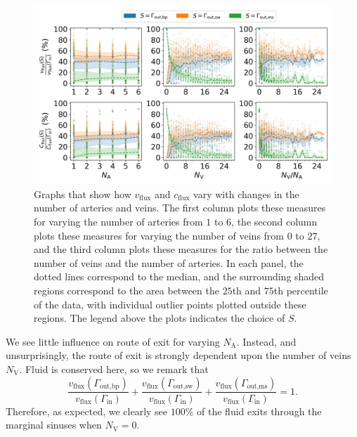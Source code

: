             \begin{figure}
                \centering
                \includegraphics[width=\textwidth]{diagrams/results-variations/mega3_no-arteries_no-veins_veins-to-arteries.png}
                \caption{Graphs that show how $v_\text{flux}$ and $c_\text{flux}$ vary with changes in the number of arteries and veins. The first column plots these measures for varying the number of arteries from $1$ to $6$, the second column plots these measures for varying the number of veins from $0$ to $27$, and the third column plots these measures for the ratio between the number of veins and the number of arteries. In each panel, the dotted lines correspond to the median, and the surrounding shaded regions correspond to the area between the $25$th and $75$th percentile of the data, with individual outlier points plotted outside these regions. The legend above the plots indicates the choice of $S$.}
                \label{fig:mega-vessels3}
            \end{figure}
            
            We see little influence on route of exit for varying $N_\text{A}$. Instead, and unsurprisingly, the route of exit is strongly dependent upon the number of veins $N_\text{V}$. Fluid is conserved here, so we remark that
            \begin{equation*}
                \frac{v_\text{flux}(\Gamma_\text{out,bp})}{v_\text{flux}(\Gamma_\text{in})} + \frac{v_\text{flux}(\Gamma_\text{out,sw})}{v_\text{flux}(\Gamma_\text{in})} + \frac{v_\text{flux}(\Gamma_\text{out,ms})}{v_\text{flux}(\Gamma_\text{in})} = 1.
            \end{equation*}
            Therefore, as expected, we clearly see $100\%$ of the fluid exits through the marginal sinuses when $N_\text{V} = 0$.

